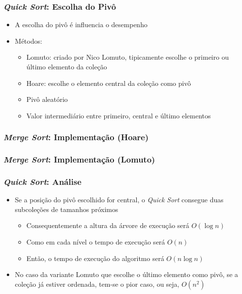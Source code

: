 \documentclass[aspectratio=169]{beamer}
\begin{document}
\begin{frame}[fragile]\frametitle{\emph{Quick Sort}: Escolha do Pivô}
\begin{itemize}
	\item A escolha do pivô é influencia o desempenho
	\item Métodos:
	\begin{itemize}
		\item Lomuto: criado por Nico Lomuto, tipicamente escolhe o primeiro ou último elemento da coleção
		\item Hoare: escolhe o elemento central da coleção como pivô
		\item Pivô aleatório
		\item Valor intermediário entre primeiro, central e último elementos
	\end{itemize}
\end{itemize}
\end{frame}

\begin{frame}\frametitle{\emph{Merge Sort}: Implementação (Hoare)}

\end{frame}

\begin{frame}\frametitle{\emph{Merge Sort}: Implementação (Lomuto)}

\end{frame}

\begin{frame}[fragile]\frametitle{\emph{Quick Sort}: Análise}
\begin{itemize}
	\item Se a posição do pivô escolhido for central, o \emph{Quick Sort} consegue duas subcoleções de tamanhos próximos
	\begin{itemize}
		\item Consequentemente a altura da árvore de execução será $O(\log{n})$
		\item Como em cada nível o tempo de execução será $O(n)$
		\item Então, o tempo de execução do algoritmo será $O(n\log{n})$
	\end{itemize}
	\item No caso da variante Lomuto que escolhe o último elemento como pivô, se a coleção já estiver ordenada, tem-se o pior caso, ou seja, $O(n^2)$
\end{itemize}
\end{frame}
\end{document}
